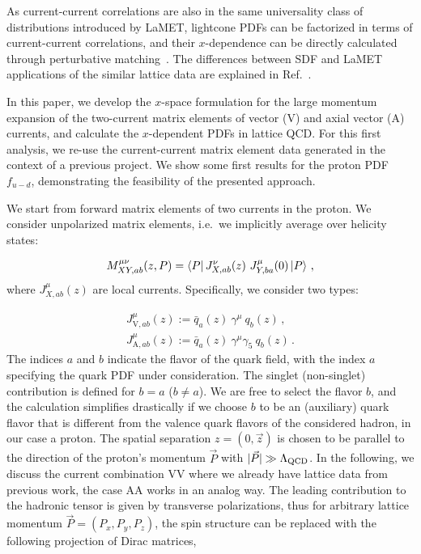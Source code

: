 \documentclass[floatfix,twocolumn,prl,showpacs,preprintnumbers,amsmath,nofootinbib,amssymb,noeprint,superscriptaddress]{revtex4-1}
\begin{document}
As current-current correlations are also in the same universality class of distributions introduced by LaMET, lightcone PDFs can be factorized in terms of current-current correlations, and their $x$-dependence can be directly calculated through perturbative matching~\cite{Ji:2024oka}. The differences between SDF and LaMET applications of the similar lattice data are explained in Ref.~\cite{Ji:2022ezo}.

In this paper, we develop the $x$-space formulation for the large momentum expansion of the two-current matrix elements of vector (V) and axial vector (A) currents, and calculate the $x$-dependent PDFs in lattice QCD. For this first analysis, we re-use the current-current matrix element data generated in the context of a previous project. We show some first results for the proton PDF $f_{u-d}$, demonstrating the feasibility of the presented approach.


We start from forward matrix elements of two currents in the proton. We consider unpolarized matrix elements, i.e.\ we implicitly average over helicity states:

\begin{align}
    M_{XY,ab}^{\mu\nu}(z,P) 
    = 
    \bra{P}
    J^\nu_{X,ab}(z)\ 
    J^\mu_{Y,ba}(0)
    \ket{P} \,,
    \label{eq:Mdef}
\end{align}
%
where $J^\mu_{X,ab}(z)$ are local currents. Specifically, we consider two types: 

\begin{align}
    J^\mu_{\mathrm{V},ab}(z) 
    :=
    \bar{q}_a(z)\ \gamma^\mu\ q_b(z)
    \,,\nonumber\\
    J^\mu_{\mathrm{A},ab}(z) 
    :=
    \bar{q}_a(z)\ \gamma^\mu \gamma_5\ q_b(z) \,.
\end{align}
The indices $a$ and $b$ indicate the flavor of the quark field, with the index $a$ specifying the quark PDF under consideration. The singlet (non-singlet) contribution is defined for $b=a$ ($b\neq a$). We are free to select the flavor $b$, and the calculation simplifies drastically if we choose $b$ to be an (auxiliary) quark flavor that is different from the valence quark flavors of the considered hadron, in our case a proton. The spatial separation $z=(0,\vec{z})$ is chosen to be parallel to the direction of the proton's momentum $\vec{P}$ with $|\vec{P}|\gg\Lambda_{\rm QCD}$.
In the following, we discuss the current combination VV where we already have lattice data from previous work, the case AA works in an analog way. 
The leading contribution to the hadronic tensor is given by transverse polarizations, thus for arbitrary lattice momentum $\vec{P}=(P_x,P_y,P_z)$, the spin structure can be replaced with the following projection of Dirac matrices,
\end{document}
